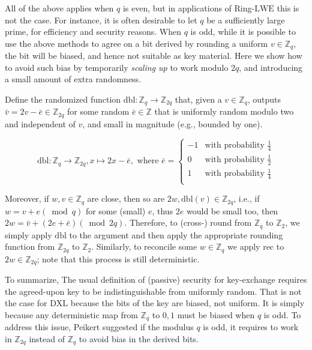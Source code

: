All of the above applies when $q$ is even, but in applications of Ring-$\mathrm{LWE}$ this is not the case. For instance, it is often desirable to let $q$ be a sufficiently large prime, for efficiency and security reasons. When $q$ is odd, while it is possible to use the above methods to agree on a bit derived by rounding a uniform $v \in \mathbb{Z}_{q}$, the bit will be biased, and hence not suitable as key material. Here we show how to avoid such bias by temporarily \textit{scaling up} to work modulo $2q$, and introducing a small amount of extra randomness.

Define the randomized function $\mathrm{dbl}: \mathbb{Z}_{q} \to \mathbb{Z}_{2q}$ that, given a $v \in \mathbb{Z}_{q}$, outputs $\bar{v} = 2v - \bar{e} \in \mathbb{Z}_{2q}$ for some random $\bar{e} \in \mathbb{Z}$ that is uniformly random modulo two and independent of $v$, and small in magnitude (e.g., bounded by one).


\[
\text{dbl}: \mathbb{Z}_q \to \mathbb{Z}_{2q}, x\mapsto2x - \bar{e}, \text{ where } \bar{e} = 
\begin{cases}
    -1 & \text{with probability } \frac{1}{4}\\
    0 & \text{with probability } \frac{1}{2}\\
    1 & \text{with probability } \frac{1}{4}\\
\end{cases}
\]


Moreover, if $w, v \in \mathbb{Z}_{q}$ are close, then so are $2w, \mathrm{dbl}(v) \in \mathbb{Z}_{2q}$, i.e., if $w = v+e (\bmod q)$ for some (small) $e$, thus $2e$ would be small too, then $2w = \bar{v} + (2e + \bar{e}) (\bmod 2q)$. Therefore, to (cross-) round from $\mathbb{Z}_{q}$ to $\mathbb{Z}_{2}$, we simply apply $\mathrm{dbl}$ to the argument and then apply the appropriate rounding function from $\mathbb{Z}_{2q}$ to $\mathbb{Z}_{2}$. Similarly, to reconcile some $w \in \mathbb{Z}_{q}$ we apply rec to $2w \in \mathbb{Z}_{2q}$; note that this process is still deterministic.

To summarize, The usual definition of (passive) security for key-exchange requires the agreed-upon key to be indistinguishable from uniformly random. That is not the case for 
$\mathrm{DXL}$ because the bits of the key are biased, not uniform. It is simply because any deterministic map from $\mathbb{Z}_{q}$ to $0,1$ must be biased when $q$ is odd. To address this issue, Peikert suggested if the modulus $q$ is odd, it requires to work in $\mathbb{Z}_{2q}$ instead of $\mathbb{Z}_{q}$ to avoid bias in the derived bits.


